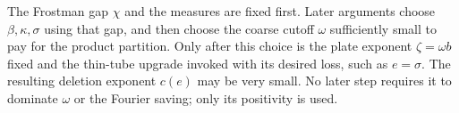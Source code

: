\begin{remark}\label{prep:parameters}
The Frostman gap $\chi$ and the measures are fixed first.
Later arguments choose $\beta,\kappa,\sigma$ using that gap, and
then choose the coarse cutoff $\omega$ sufficiently small to pay for
the product partition. Only after this choice is the plate exponent
$\zeta=\omega b$ fixed and the thin-tube upgrade invoked with its
desired loss, such as $e=\sigma$. The resulting deletion exponent
$c(e)$ may be very small. No later step requires it to dominate
$\omega$ or the Fourier saving; only its positivity is used.
\end{remark}
